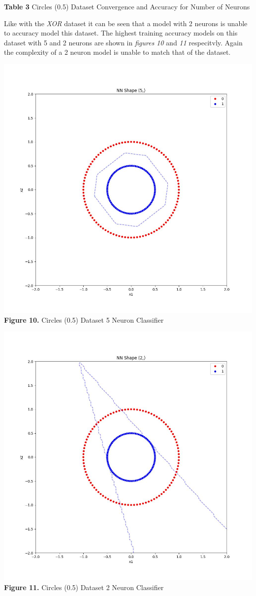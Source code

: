 \documentclass[11pt]{article}
\begin{document}
\textbf{Table 3} Circles (0.5) Dataset Convergence and Accuracy for
Number of Neurons

Like with the \emph{XOR} dataset it can be seen that a model with 2
neurons is unable to accuracy model this dataset. The highest training
accuracy models on this dataset with 5 and 2 neurons are shown in
\emph{figures 10} and \emph{11} respecitvly. Again the complexity of a 2
neuron model is unable to match that of the dataset.

\includegraphics{figures/cir05_5_clf.jpg}\\
\textbf{Figure 10.} Circles (0.5) Dataset 5 Neuron Classifier

\includegraphics{figures/cir05_2_clf.jpg}\\
\textbf{Figure 11.} Circles (0.5) Dataset 2 Neuron Classifier
\end{document}

